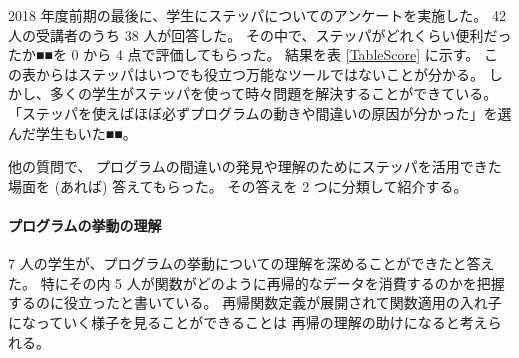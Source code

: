 2018 年度前期の最後に、学生にステッパについてのアンケートを実施した。
42 人の受講者のうち 38 人が回答した。
その中で、ステッパがどれくらい便利だったか■■を 0 から 4 点で評価してもらった。
結果を表 \ref{TableScore} に示す。
この表からはステッパはいつでも役立つ万能なツールではないことが分かる。
しかし、多くの学生がステッパを使って時々問題を解決することができている。
「ステッパを使えばほぼ必ずプログラムの動きや間違いの原因が分かった」を選んだ学生もいた■■。

他の質問で、
プログラムの間違いの発見や理解のためにステッパを活用できた場面を (あれば) 答えてもらった。
その答えを 2 つに分類して紹介する。

\paragraph{プログラムの挙動の理解}
7 人の学生が、プログラムの挙動についての理解を深めることができたと答えた。
特にその内 5 人が関数がどのように再帰的なデータを消費するのかを把握するのに役立ったと書いている。
再帰関数定義が展開されて関数適用の入れ子になっていく様子を見ることができることは
再帰の理解の助けになると考えられる。


